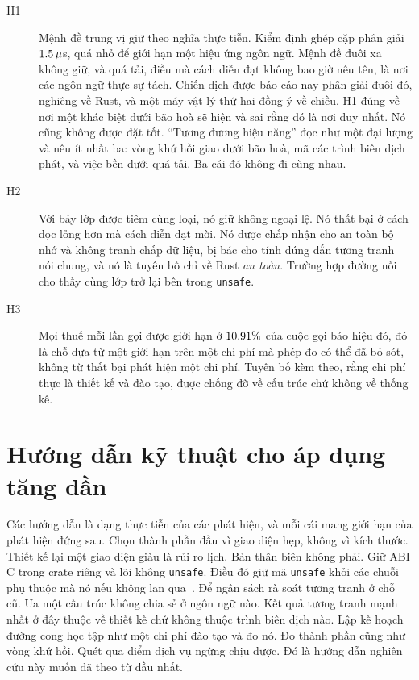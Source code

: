 \begin{description}
  \item[H1] Mệnh đề trung vị giữ theo nghĩa thực tiễn. Kiểm định ghép cặp phân giải
        $1.5\,\mu$s, quá nhỏ để giới hạn một hiệu ứng ngôn ngữ. Mệnh đề đuôi xa
        không giữ, và quá tải, điều mà cách diễn đạt không bao giờ nêu tên, là nơi các ngôn ngữ
        thực sự tách. Chiến dịch được báo cáo nay phân giải đuôi đó, nghiêng về Rust, và một máy
        vật lý thứ hai đồng ý về chiều. H1 đúng về nơi một khác biệt dưới bão hoà sẽ hiện và sai
        rằng đó là nơi duy nhất. Nó cũng không được đặt tốt. ``Tương đương hiệu năng'' đọc như
        một đại lượng và nêu ít nhất ba: vòng khứ hồi giao dưới bão hoà, mã các trình biên dịch
        phát, và việc bền dưới quá tải. Ba cái đó không đi cùng nhau.
  \item[H2] Với bảy lớp được tiêm cùng loại, nó giữ không ngoại lệ. Nó thất bại ở cách đọc lỏng
        hơn mà cách diễn đạt mời. Nó được chấp nhận cho an toàn bộ nhớ và không tranh chấp dữ
        liệu, bị bác cho tính đúng đắn tương tranh nói chung, và nó là tuyên bố chỉ về Rust
        \emph{an toàn}. Trường hợp đường nối cho thấy cùng lớp trở lại bên trong
        \texttt{unsafe}.
  \item[H3] Mọi thuế mỗi lần gọi được giới hạn ở $10.91\%$ của cuộc gọi báo hiệu đó, đó
        là chỗ dựa từ một giới hạn trên một chi phí mà phép đo có thể đã bỏ sót, không từ thất
        bại phát hiện một chi phí. Tuyên bố kèm theo, rằng chi phí thực là thiết kế và đào tạo,
        được chống đỡ về cấu trúc chứ không về thống kê.
\end{description}

\section{Hướng dẫn kỹ thuật cho áp dụng tăng dần}\label{sec:guidelines}
Các hướng dẫn là dạng thực tiễn của các phát hiện, và mỗi cái mang giới hạn của phát hiện đứng
sau. Chọn thành phần đầu vì giao diện hẹp, không vì kích thước. Thiết kế lại một giao diện giàu
là rủi ro lịch. Bản thân biên không phải. Giữ ABI C trong crate riêng và lõi không
\texttt{unsafe}. Điều đó giữ mã \texttt{unsafe} khỏi các chuỗi phụ thuộc mà nó nếu không lan
qua~\cite{evans2020rust}. Để ngân sách rà soát tương tranh ở chỗ cũ. Ưa một cấu trúc không chia
sẻ ở ngôn ngữ nào. Kết quả tương tranh mạnh nhất ở đây thuộc về thiết kế chứ không thuộc trình
biên dịch nào. Lập kế hoạch đường cong học tập như một chi phí đào tạo và đo nó. Đo thành phần
cũng như vòng khứ hồi. Quét qua điểm dịch vụ ngừng chịu được. Đó là hướng dẫn nghiên cứu này
muốn đã theo từ đầu nhất.

